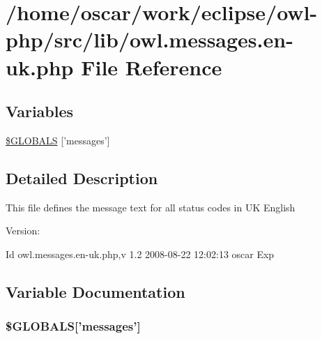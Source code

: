 \hypertarget{owl_8messages_8en-uk_8php}{
\section{/home/oscar/work/eclipse/owl-php/src/lib/owl.messages.en-uk.php File Reference}
\label{owl_8messages_8en-uk_8php}
}
\subsection*{Variables}
\begin{CompactItemize}
\item 
\hyperlink{owl_8messages_8en-uk_8php_65f2996116eed36e9ab25f254a470259}{\$GLOBALS} \mbox{[}'messages'\mbox{]}
\end{CompactItemize}


\subsection{Detailed Description}
This file defines the message text for all status codes in UK English \begin{Desc}
\item[Version:]\end{Desc}
\begin{Desc}
\item[Id]owl.messages.en-uk.php,v 1.2 2008-08-22 12:02:13 oscar Exp \end{Desc}


\subsection{Variable Documentation}
\hypertarget{owl_8messages_8en-uk_8php_65f2996116eed36e9ab25f254a470259}{
\subsubsection{\setlength{\rightskip}{0pt plus 5cm}\$GLOBALS\mbox{[}'messages'\mbox{]}}}
\label{owl_8messages_8en-uk_8php_65f2996116eed36e9ab25f254a470259}


